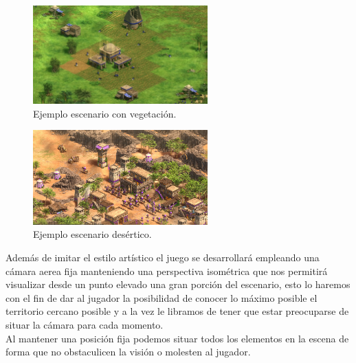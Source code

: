 \begin{figure}[ht]
\centering
\includegraphics[width=0.6\textwidth]{imagenes/gdd/mapa_aoe_1.jpg}
\caption{Ejemplo escenario con vegetación.}
\label{img:mapa_aoe1}
\end{figure}

\begin{figure}[ht]
\centering
\includegraphics[width=0.6\textwidth]{imagenes/gdd/mapa_aoe_2.jpg}
\caption{Ejemplo escenario desértico.}
\label{img:mapa_aoe2}
\end{figure}

Además de imitar el estilo artístico el juego se desarrollará empleando una cámara
aerea fija manteniendo una perspectiva isométrica que nos permitirá visualizar desde
un punto elevado una gran porción del escenario, esto lo haremos con el fin de dar al
jugador la posibilidad de conocer lo máximo posible el territorio cercano posible y a la
vez le libramos de tener que estar preocuparse de situar la cámara para cada momento. \\
Al mantener una posición fija podemos situar todos los elementos en la escena de forma
que no obstaculicen la visión o molesten al jugador.



